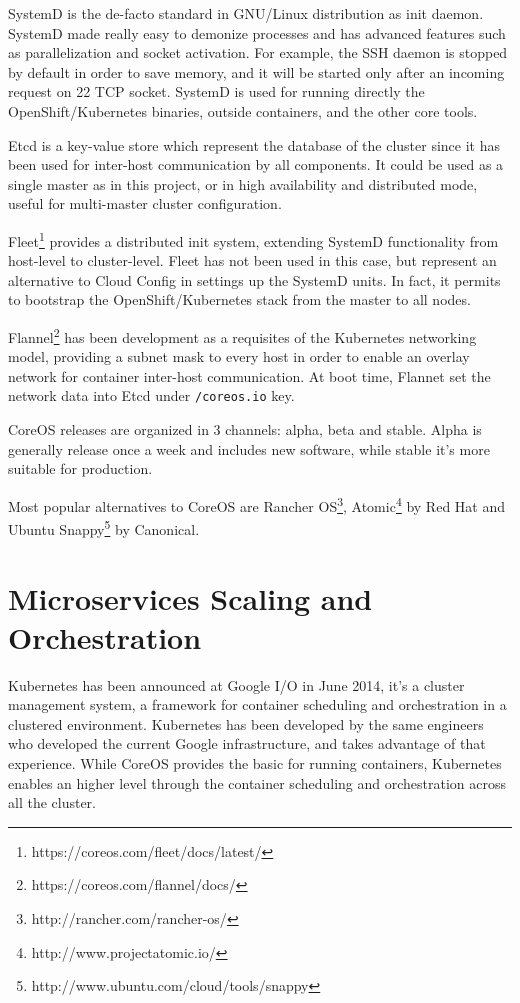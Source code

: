 SystemD is the de-facto standard in GNU/Linux distribution as init daemon. SystemD made really easy to demonize processes and has advanced features such as parallelization and socket activation.  For example, the SSH daemon is stopped by default in order to save memory, and it will be started only after an incoming request on 22 TCP socket.  SystemD is used for running directly the OpenShift/Kubernetes binaries, outside containers, and the other core tools.

Etcd is a key-value store which represent the database of the cluster since it has been used for inter-host communication by all components.  It could be used as a single master as in this project, or in high availability and distributed mode, useful for multi-master cluster configuration.

Fleet\footnote{https://coreos.com/fleet/docs/latest/} provides a distributed init system, extending SystemD functionality from host-level to cluster-level.  Fleet has not been used in this case, but represent an alternative to Cloud Config in settings up the SystemD units.  In fact, it permits to bootstrap the OpenShift/Kubernetes stack from the master to all nodes.

Flannel\footnote{https://coreos.com/flannel/docs/} has been development as a requisites of the Kubernetes networking model, providing a subnet mask to every host in order to enable an overlay network for container inter-host communication.  At boot time, Flannet set the network data into Etcd under \texttt{/coreos.io} key.

CoreOS releases are organized in 3 channels: alpha, beta and stable. Alpha is generally release once a week and includes new software, while stable it's more suitable for production.

Most popular alternatives to CoreOS are Rancher OS\footnote{http://rancher.com/rancher-os/}, Atomic\footnote{http://www.projectatomic.io/} by Red Hat and Ubuntu Snappy\footnote{http://www.ubuntu.com/cloud/tools/snappy} by Canonical.

\section{Microservices Scaling and Orchestration}\label{microservices-scaling-and-orchestration}

Kubernetes has been announced at Google I/O in June 2014, it's a cluster management system, a framework for container scheduling and orchestration in a clustered environment. Kubernetes has been developed by the same engineers who developed the current Google infrastructure, and takes advantage of that experience.  While CoreOS provides the basic for running containers, Kubernetes enables an higher level through the container scheduling and orchestration across all the cluster.

